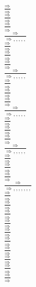 \documentclass[11pt]{article}
\begin{document}
\begin{center}
\bigskip
\\$\frac{\Rightarrow }{\Rightarrow }$
\bigskip
\\$\frac{\Rightarrow }{\Rightarrow }$
\bigskip
\\$\frac{\Rightarrow }{\Rightarrow }$
\bigskip
\\$\frac{\Rightarrow }{\Rightarrow , , , , , }$
\bigskip
\\$\frac{\Rightarrow }{\Rightarrow }$
\bigskip
\\$\frac{\Rightarrow }{\Rightarrow }$
\bigskip
\\$\frac{\Rightarrow }{\Rightarrow }$
\bigskip
\\$\frac{\Rightarrow }{\Rightarrow , , , , , }$
\bigskip
\\$\frac{\Rightarrow }{\Rightarrow }$
\bigskip
\\$\frac{\Rightarrow }{\Rightarrow }$
\bigskip
\\$\frac{\Rightarrow }{\Rightarrow }$
\bigskip
\\$\frac{\Rightarrow }{\Rightarrow , , , , , }$
\bigskip
\\$\frac{\Rightarrow }{\Rightarrow }$
\bigskip
\\$\frac{\Rightarrow }{\Rightarrow }$
\bigskip
\\$\frac{\Rightarrow }{\Rightarrow }$
\bigskip
\\$\frac{\Rightarrow }{\Rightarrow , , , , , }$
\bigskip
\\$\frac{\Rightarrow }{\Rightarrow }$
\bigskip
\\$\frac{\Rightarrow }{\Rightarrow }$
\bigskip
\\$\frac{\Rightarrow }{\Rightarrow }$
\bigskip
\\$\frac{\Rightarrow }{\Rightarrow , , , , , , , }$
\bigskip
\\$\frac{\Rightarrow }{\Rightarrow }$
\bigskip
\\$\frac{\Rightarrow }{\Rightarrow }$
\bigskip
\\$\frac{\Rightarrow }{\Rightarrow }$
\bigskip
\\$\frac{\Rightarrow }{\Rightarrow }$
\bigskip
\\$\frac{\Rightarrow }{\Rightarrow }$
\bigskip
\\$\frac{\Rightarrow }{\Rightarrow }$
\bigskip
\\$\frac{\Rightarrow }{\Rightarrow }$
\bigskip
\\$\frac{\Rightarrow }{\Rightarrow }$
\bigskip
\\$\frac{\Rightarrow }{\Rightarrow }$
\bigskip
\\$\frac{\Rightarrow }{\Rightarrow }$

\end{center}
\end{document}

